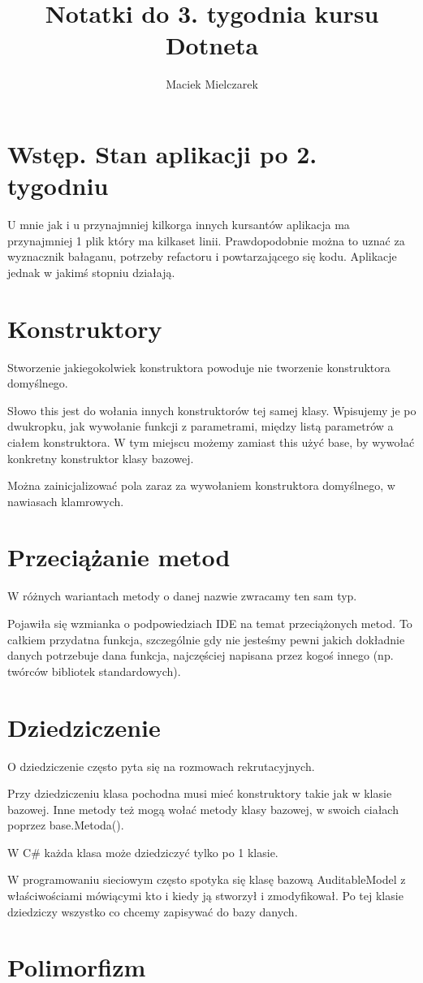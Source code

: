 \documentclass[10pt]{article}
\title{Notatki do 3. tygodnia kursu Dotneta}
\author{Maciek Mielczarek}
\begin{document}
\maketitle

\section{Wstęp. Stan aplikacji po 2. tygodniu}
U mnie jak i u przynajmniej kilkorga innych kursantów aplikacja ma przynajmniej 1 plik który ma kilkaset linii. Prawdopodobnie można to uznać za wyznacznik bałaganu, potrzeby refactoru i powtarzającego się kodu. Aplikacje jednak w jakimś stopniu działają.

\section{Konstruktory}
Stworzenie jakiegokolwiek konstruktora powoduje nie tworzenie konstruktora domyślnego.

Słowo this jest do wołania innych konstruktorów tej samej klasy. Wpisujemy je po dwukropku, jak wywołanie funkcji z parametrami, między listą parametrów a ciałem konstruktora. W tym miejscu możemy zamiast this użyć base, by wywołać konkretny konstruktor klasy bazowej.

Można zainicjalizować pola zaraz za wywołaniem konstruktora domyślnego, w nawiasach klamrowych.

\section{Przeciążanie metod}
W różnych wariantach metody o danej nazwie zwracamy ten sam typ.

Pojawiła się wzmianka o podpowiedziach IDE na temat przeciążonych metod. To całkiem przydatna funkcja, szczególnie gdy nie jesteśmy pewni jakich dokładnie danych potrzebuje dana funkcja, najczęściej napisana przez kogoś innego (np. twórców bibliotek standardowych).

\section{Dziedziczenie}
O dziedziczenie często pyta się na rozmowach rekrutacyjnych.

Przy dziedziczeniu klasa pochodna musi mieć konstruktory takie jak w klasie bazowej. Inne metody też mogą wołać metody klasy bazowej, w swoich ciałach poprzez base.Metoda().

W C\# każda klasa może dziedziczyć tylko po 1 klasie.

W programowaniu sieciowym często spotyka się klasę bazową AuditableModel z właściwościami mówiącymi kto i kiedy ją stworzył i zmodyfikował. Po tej klasie dziedziczy wszystko co chcemy zapisywać do bazy danych.

\section{Polimorfizm}
\end{document}
